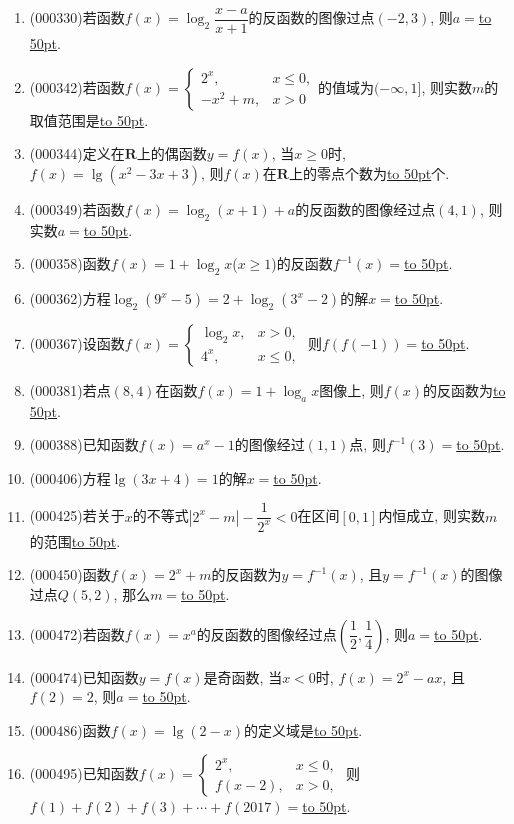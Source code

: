 \documentclass[10pt,a4paper]{article}
\newcommand{\blank}[1]{\underline{\hbox to #1pt{}}}
\begin{document}
\begin{enumerate}[1.]
\item {\tiny (000330)}若函数$f(x)=\log_2\dfrac{x-a}{x+1}$的反函数的图像过点$(-2,3)$, 则$a=$\blank{50}.
\item {\tiny (000342)}若函数$f(x)=\begin{cases}    2^x, & x\le 0, \\ -x^2+m, & x>0 \end{cases}$的值域为$(-\infty ,1]$, 则实数$m$的取值范围是\blank{50}.
\item {\tiny (000344)}定义在$\mathbf{R}$上的偶函数$y=f(x)$, 当$x\ge 0$时, $f(x)=\lg (x^2-3x+3)$, 则$f(x)$在$\mathbf{R}$上的零点个数为\blank{50}个.
\item {\tiny (000349)}若函数$f(x)=\log_2 (x+1)+a$的反函数的图像经过点$(4,1)$, 则实数$a=$\blank{50}.
\item {\tiny (000358)}函数$f(x)=1+\log_2 x$($x\ge 1$)的反函数$f^{-1}(x)=$\blank{50}.
\item {\tiny (000362)}方程$\log_2(9^x-5)=2+\log_2(3^x-2)$的解$x=$\blank{50}.
\item {\tiny (000367)}设函数$f(x)=\begin{cases}\log_2 x, & x>0, \\ 4^x, & x\le 0,\end{cases}$ 则$f(f(-1))=$\blank{50}.
\item {\tiny (000381)}若点$(8,4)$在函数$f(x)=1+\log_a x$图像上, 则$f(x)$的反函数为\blank{50}.
\item {\tiny (000388)}已知函数$f(x)=a^x-1$的图像经过$(1,1)$点, 则$f^{-1}(3)=$\blank{50}.
\item {\tiny (000406)}方程$\lg (3x+4)=1$的解$x=$\blank{50}.
\item {\tiny (000425)}若关于$x$的不等式$|2^x-m|-\dfrac1{2^x}<0$在区间$[0,1]$内恒成立, 则实数$m$的范围\blank{50}.
\item {\tiny (000450)}函数$f(x)=2^x+m$的反函数为$y=f^{-1}(x)$, 且$y=f^{-1}(x)$的图像过点$Q(5,2)$, 那么$m=$\blank{50}.
\item {\tiny (000472)}若函数$f(x)=x^a$的反函数的图像经过点$(\dfrac12,\dfrac14)$, 则$a=$\blank{50}.
\item {\tiny (000474)}已知函数$y=f(x)$是奇函数, 当$x<0$时, $f(x)=2^x-ax$, 且$f(2)=2$, 则$a=$\blank{50}.
\item {\tiny (000486)}函数$f(x)=\lg(2-x)$的定义域是\blank{50}.
\item {\tiny (000495)}已知函数$f(x)=\begin{cases} 2^x, & x\le 0, \\ f(x-2), & x>0, \end{cases}$ 则$f(1)+f(2)+f(3)+\cdots+f(2017)=$\blank{50}.

\end{enumerate}
\end{document}
